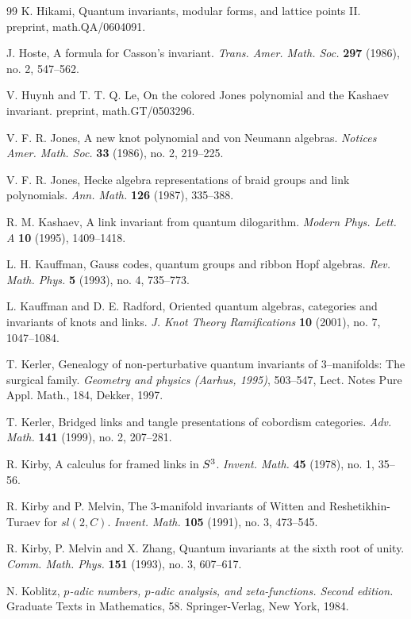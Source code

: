 \documentclass{amsart}
\numberwithin{equation}{section}
\numberwithin{figure}{section}
\theoremstyle{plain}
\theoremstyle{definition}
\theoremstyle{remark}
\begin{document}
\begin{thebibliography}{99}
K. Hikami,
Quantum invariants, modular forms, and lattice points II.
preprint, math.QA/0604091.

J. Hoste,
A formula for Casson's invariant.
{\it Trans. Amer. Math. Soc.} {\bf 297} (1986), no. 2, 547--562.

V. Huynh and T. T. Q. Le,
On the colored Jones polynomial and the Kashaev invariant.
preprint, math.GT/0503296.

V. F. R. Jones,
A new knot polynomial and von Neumann algebras.
{\it Notices Amer. Math. Soc.} {\bf 33} (1986), no. 2, 219--225.

V. F. R. Jones,
Hecke algebra representations of braid groups and link polynomials.
{\it Ann. Math.} {\bf 126} (1987), 335--388.

R. M. Kashaev,
A link invariant from quantum dilogarithm.
{\it Modern Phys. Lett. A} {\bf 10} (1995), 1409--1418.

L. H. Kauffman,
Gauss codes, quantum groups and ribbon Hopf algebras.
{\it Rev. Math. Phys.} {\bf 5} (1993), no. 4, 735--773.

L. Kauffman and D. E. Radford,
Oriented quantum algebras, categories and invariants of knots and links.
{\it J. Knot Theory Ramifications} {\bf 10} (2001), no. 7, 1047--1084.

T. Kerler,
Genealogy of non-perturbative quantum invariants of $3$--manifolds: The surgical family.
{\it Geometry and physics (Aarhus, 1995)}, 503--547, Lect. Notes Pure Appl. Math., 184, Dekker, 1997.

T. Kerler,
Bridged links and tangle presentations of cobordism categories.
{\it Adv. Math.} {\bf 141} (1999), no. 2, 207--281.

R. Kirby,
A calculus for framed links in $S\sp{3}$.
{\it Invent. Math.} {\bf 45} (1978), no. 1, 35--56.

R. Kirby and P. Melvin,
The $3$-manifold invariants of Witten and Reshetikhin-Turaev for $sl(2,C)$.
{\it Invent. Math.} {\bf 105}  (1991), no. 3, 473--545.

R. Kirby, P. Melvin and X. Zhang,
Quantum invariants at the sixth root of unity.
{\it Comm. Math. Phys.} {\bf 151} (1993), no. 3, 607--617.

N. Koblitz,
{\it $p$-adic numbers, $p$-adic analysis, and zeta-functions. Second edition.}
Graduate Texts in Mathematics, 58. Springer-Verlag, New York, 1984.


\end{thebibliography}
\end{document}
